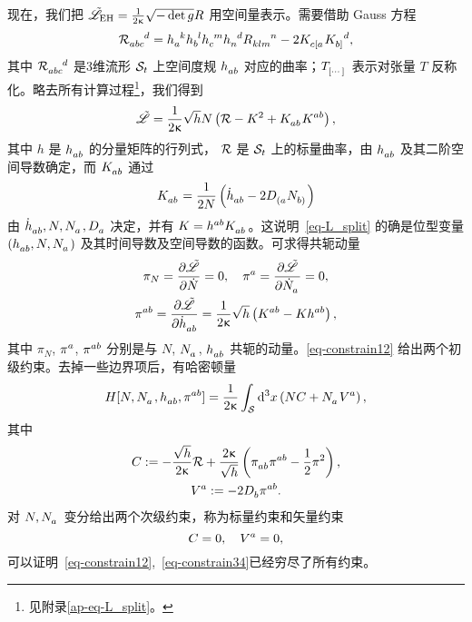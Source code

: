 		现在，我们把 $\tilde{\mathscr{L}}_{\text{EH}} = \frac{1}{2\upkappa} \sqrt{- \det g} {R}$ 用空间量表示。需要借助 Gauss 方程
		\begin{equation}
			\tensor{\spacecurR}{_a_b_c^d} = \tensor{h}{_a^k} \tensor{h}{_b^l} \tensor{h}{_c^m} \tensor{h}{_n^d} \tensor{\curR}{_k_l_m^n} - 2 \tensor{K}{_{c[a}} \tensor{K}{_{b]}^d}, \label{eqgauss}
		\end{equation}
		其中 $\tensor{\spacecurR}{_a_b_c^d}$ 是3维流形 $\mathcal{S}_t$ 上空间度规 $\tensor{h}{_a_b}$ 对应的曲率；$\tensor{T}{_{[\cdots]}}$ 表示对张量 $T$ 反称化。略去所有计算过程\footnote{见附录\ref{ap-eq-L_split}。}，我们得到
		\begin{equation}
			\Lad = \frac{1}{2\gkappa} \sqrt{h} N \left( \spacecurR - K^2 + \tensor{K}{_a_b} \tensor{K}{^a^b} \right), \label{eq-L_split}
		\end{equation}
		其中 $h$ 是 $\tensor{h}{_a_b}$ 的分量矩阵的行列式， $\mathcal{R}$ 是 $\mathcal{S}_t$ 上的标量曲率，由 $\tensor{h}{_a_b}$ 及其二阶空间导数确定，而 $\tensor{K}{_a_b}$ 通过
		\begin{equation}
			\tensor{K}{_a_b} = \frac{1}{2N} \left( \tensor{\dot{h}}{_a_b} - 2 \tensor{D}{_{(a}} \tensor{N}{_{b)}} \right)
		\end{equation}
		由 $\tensor{\dot{h}}{_a_b}, N, \tensor{N}{_a}, \spaceD{a}$ 决定，并有 $K = \tensor{h}{^a^b} \tensor{K}{_a_b}$。这说明~\eqref{eq-L_split} 的确是位型变量 $\left( \tensor{h}{_a_b} , N, \tensor{N}{_a} \right)$ 及其时间导数及空间导数的函数。可求得共轭动量
		\begin{gather}
			\pi_N = \pdv{\Lad}{\dot{N}} = 0 \qc \tensor{\pi}{^a} = \pdv{\Lad}{\tensor{\dot{N}}{_a}} = 0, \label{eq-constrain12}\\
			\tensor{\pi}{^a^b} = \pdv{\Lad}{\tensor{\dot{h}}{_a_b}} = \frac{1}{2\gkappa} \sqrt{h} \left( \tensor{K}{^a^b} - K \tensor{h}{^a^b} \right), \label{eq-pi}
		\end{gather}
		其中 $\pi_N$, $\tensor{\pi}{^a}$, $\tensor{\pi}{^a^b}$ 分别是与 $N$, $\tensor{N}{_a}$, $\tensor{h}{_a_b}$ 共轭的动量。\eqref{eq-constrain12} 给出两个初级约束。去掉一些边界项后，有哈密顿量
		\begin{equation}
			H[N,\tensor{N}{_a}, \tensor{h}{_a_b}, \tensor{\pi}{^a^b}] = \frac{1}{2\gkappa} \int_{\spc} \dd[3]{x} \left( N C + \tensor{N}{_a} \tensor{V}{^a} \right), \label{eq-ADM_H}
		\end{equation}
		其中
		\begin{gather}
			C \definedby - \frac{\sqrt{h}}{2\gkappa} \spacecurR + \frac{2\gkappa}{\sqrt{h}} \left( \tensor{\pi}{_a_b} \tensor{\pi}{^a^b} - \frac{1}{2} \pi^2 \right),\\
			\tensor{V}{^a} \definedby -2 \spaceD{b} \tensor{\pi}{^a^b}.
		\end{gather}
		对 $N, \tensor{N}{_a}$ 变分给出两个次级约束，称为标量约束和矢量约束
		\begin{equation}
			C = 0 \qc \tensor{V}{^a} = 0, \label{eq-constrain34}
		\end{equation}
		可以证明~\eqref{eq-constrain12},~\eqref{eq-constrain34}已经穷尽了所有约束。

